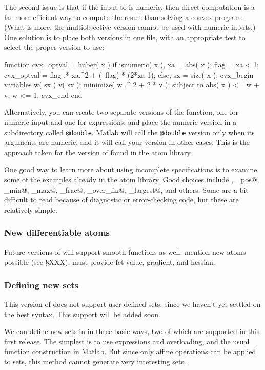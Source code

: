 \documentclass[12pt]{article}
\begin{document}
The second issue is that if the input to \verb@huber@ is numeric, then
direct computation is a far more efficient way to compute the result
than solving a convex program. (What is more, the multiobjective version
cannot be used with numeric inputs.) One solution is to place 
both versions in one file, with an appropriate test to select
the proper version to use:
\begin{code}
	function cvx_optval = huber( x )
	if isnumeric( x ),
	    xa   = abs( x );
	    flag = xa < 1;
	    cvx_optval = flag .* xa.^2 + (~flag) * (2*xa-1);
	else,
	    sx = size( x );
	    cvx_begin
	        variables w( sx ) v( sx );
	        minimize( w .^ 2 + 2 * v );
	        subject to
	            abs( x ) <= w + v;
	            w <= 1;
	    cvx_end
	end
\end{code}
Alternatively, you can create two separate versions of the function, one 
for numeric input and one for \cvx expressions; and 
place the numeric version in a subdirectory called
\verb+@double+. Matlab will call the \verb+@double+ version only when its
arguments are numeric, and it will call your \cvx version in other cases.
This is the approach taken for the version of \verb@huber@ found in the \cvx
atom library.

One good way to learn more about using incomplete specifications is to
examine some of the examples already in the \cvx atom library. 
Good choices include \verb@huber@, \verb@inv_pos@, \verb@lambda_min@,
\verb@lambda_max@, \verb@matrix_frac@, \verb@quad_over_lin@,
\verb@sum_largest@, and others. Some are
a bit difficult to read because of diagnostic or error-checking code,
but these are relatively simple.

\iffalse
\subsubsection{New differentiable atoms}
Future versions of \cvx will support smooth functions as well.
mention new atoms possible (see \S XXX). must provide fct value,
gradient, and hessian.

\subsubsection{Defining new sets}
This version of \cvx does not support user-defined sets,
since we haven't yet settled on the best syntax.
This support will be added soon.

We can define new sets in \cvx in three basic ways, two of which
are supported in this first release.
The simplest is to use expressions and overloading, and the usual
function construction in Matlab.  But since only affine operations
can be applied to sets, this method cannot generate very 
interesting sets. 
\end{document}
